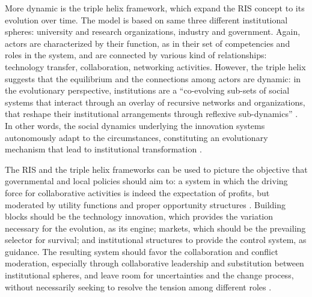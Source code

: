 More dynamic is the triple helix framework, which expand the RIS concept to its evolution over time. The model is based on same three different institutional spheres: university and research organizations, industry and government. Again, actors are characterized by their function, as in their set of competencies and roles in the system, and are connected by various kind of relationships: technology transfer, collaboration, networking activities. However, the triple helix suggests that the equilibrium and the connections among actors are dynamic: in the evolutionary perspective, institutions are a \enquote{co-evolving sub-sets of social systems that interact through an overlay of recursive networks and organizations, that reshape their institutional arrangements through reflexive sub-dynamics} \citep{Ranga2013}. In other words, the social dynamics underlying the innovation systems autonomously adapt to the circumstances, constituting an evolutionary mechanism that lead to institutional transformation \citep{Etzkowitz2000}.

The RIS and the triple helix frameworks can be used to picture the objective that governmental and local policies should aim to: a system in which the driving force for collaborative activities is indeed the expectation of profits, but moderated by utility functions and proper opportunity structures \citep{Etzkowitz2000}. Building blocks should be the technology innovation, which provides the variation necessary for the evolution, as its engine; markets, which should be the prevailing selector for survival; and institutional structures to provide the control system, as guidance. The resulting system should favor the collaboration and conflict moderation, especially through collaborative leadership and substitution between institutional spheres, and leave room for uncertainties and the change process, without necessarily seeking to resolve the tension among different roles \citep{Ranga2013}. 
